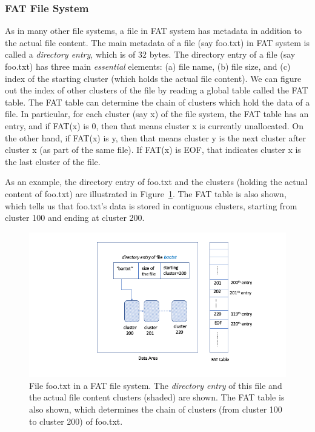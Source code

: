 \begin{paraphrase}
\subsubsection{FAT File System} \label{subsubsec:fat-overview}
 As in many other file systems, a file in FAT system has metadata in addition to the actual file content. 
The main metadata of a file (say foo.txt) in FAT system is called a \emph{directory entry}, which is of 32 bytes.
The directory entry of a file (say foo.txt) has three main \emph{essential} elements: (a) file name, (b) file size, and 
(c) index of the starting cluster (which holds the actual file content). We can figure 
out the index of other clusters of the file by reading a global table called the FAT table. The FAT table
can determine the chain of clusters which hold the data of a file. In particular, 
for each cluster (say x) of the file system, the FAT table has an entry, and 
if FAT(x) is 0, then that means cluster x is currently unallocated. 
On the other hand, if FAT(x) is y, then that means cluster y is the next cluster after cluster x (as part of the same file).
If FAT(x) is EOF, that indicates cluster x is the last cluster of the file.
   
As an example, the directory entry of foo.txt and the clusters (holding the actual content of foo.txt) 
are illustrated in Figure~\ref{fig:fat1}. The FAT table is also shown, which tells us that foo.txt's data is stored 
in contiguous clusters, starting from cluster 100 and ending at cluster 200.

\begin{figure}[h]
     \centering
     \includegraphics[width=\linewidth]{fig/fat1.png}
     \caption{File foo.txt in a FAT file system. The \emph{directory entry} of this file and the actual file content clusters (shaded) are shown. 
 The FAT table is also shown, which determines the chain of clusters (from cluster 100 to cluster 200) of foo.txt.}
     \label{fig:fat1}
 \end{figure}



\end{paraphrase}
